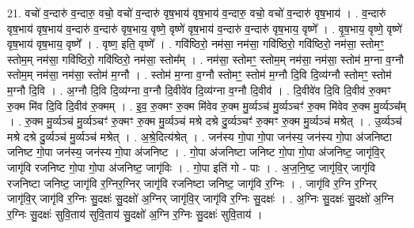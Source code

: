\documentclass[17pt]{extarticle}
\begin{document}
21. वचो॑ व॒न्दारु॑ व॒न्दारु॒ वचो॒ वचो॑ व॒न्दारु॑ वृष॒भाय॑ वृष॒भाय॑ व॒न्दारु॒ वचो॒ वचो॑ 
व॒न्दारु॑ वृष॒भाय॑ । . व॒न्दारु॑ वृष॒भाय॑ वृष॒भाय॑ व॒न्दारु॑ व॒न्दारु॑ वृष॒भाय॒ वृष्णे॒ वृष्णे॑ वृष॒भाय॑ व॒न्दारु॑ व॒न्दारु॑ वृष॒भाय॒ वृष्णे᳚ । . वृ॒ष॒भाय॒ वृष्णे॒ वृष्णे॑ वृष॒भाय॑ वृष॒भाय॒ वृष्णे᳚ । . वृष्ण॒ इति॒ वृष्णे᳚ । . गवि॑ष्ठिरो॒ नम॑सा॒ नम॑सा॒ गवि॑ष्ठिरो॒ गवि॑ष्ठिरो॒ नम॑सा॒ स्तोमꣳ॒॒ स्तोम॒म् नम॑सा॒ गवि॑ष्ठिरो॒ गवि॑ष्ठिरो॒ नम॑सा॒ स्तोम᳚म् । . नम॑सा॒ स्तोमꣳ॒॒ स्तोम॒म् नम॑सा॒ नम॑सा॒ स्तोम॑ म॒ग्ना व॒ग्नौ स्तोम॒म् नम॑सा॒ नम॑सा॒ स्तोम॑ म॒ग्नौ । . स्तोम॑ म॒ग्ना व॒ग्नौ स्तोमꣳ॒॒ स्तोम॑ म॒ग्नौ दि॒वि दि॒व्य॑ग्नौ स्तोमꣳ॒॒ स्तोम॑ म॒ग्नौ दि॒वि । . अ॒ग्नौ दि॒वि दि॒व्य॑ग्ना व॒ग्नौ दि॒वीवे॑व दि॒व्य॑ग्ना व॒ग्नौ दि॒वीव॑ । . दि॒वीवे॑व दि॒वि दि॒वीव॑ रु॒क्मꣳ रु॒क्म मि॑व दि॒वि दि॒वीव॑ रु॒क्मम् । . इ॒व॒ रु॒क्मꣳ रु॒क्म मि॑वेव रु॒क्म मु॒र्व्यञ्च॑ मु॒र्व्यञ्चꣳ॑ रु॒क्म मि॑वेव रु॒क्म मु॒र्व्यञ्च᳚म् । . रु॒क्म मु॒र्व्यञ्च॑ मु॒र्व्यञ्चꣳ॑ रु॒क्मꣳ रु॒क्म मु॒र्व्यञ्च॑ मश्रे दश्रे दु॒र्व्यञ्चꣳ॑ रु॒क्मꣳ रु॒क्म मु॒र्व्यञ्च॑ मश्रेत् । . उ॒र्व्यञ्च॑ मश्रे दश्रे दु॒र्व्यञ्च॑ मु॒र्व्यञ्च॑ मश्रेत् । . अ॒श्रे॒दित्य॑श्रेत् । . जन॑स्य गो॒पा गो॒पा जन॑स्य॒ जन॑स्य गो॒पा अ॑जनिष्टा जनिष्ट गो॒पा जन॑स्य॒ जन॑स्य गो॒पा अ॑जनिष्ट । . गो॒पा अ॑जनिष्टा जनिष्ट गो॒पा गो॒पा अ॑जनिष्ट॒ जागृ॑वि॒र् जागृ॑वि रजनिष्ट गो॒पा गो॒पा अ॑जनिष्ट॒ जागृ॑विः । . गो॒पा इति॑ गो - पाः । . अ॒ज॒नि॒ष्ट॒ जागृ॑वि॒र् जागृ॑वि रजनिष्टा जनिष्ट॒ जागृ॑वि र॒ग्निर॒ग्निर् जागृ॑वि रजनिष्टा जनिष्ट॒ जागृ॑वि र॒ग्निः । . जागृ॑वि र॒ग्नि र॒ग्निर् जागृ॑वि॒र् जागृ॑वि र॒ग्निः सु॒दक्षः॑ सु॒दक्षो॑ अ॒ग्निर् जागृ॑वि॒र् जागृ॑वि र॒ग्निः सु॒दक्षः॑ । . अ॒ग्निः सु॒दक्षः॑ सु॒दक्षो॑ अ॒ग्नि र॒ग्निः सु॒दक्षः॑ सुवि॒ताय॑ सुवि॒ताय॑ सु॒दक्षो॑ अ॒ग्नि र॒ग्निः सु॒दक्षः॑ सुवि॒ताय॑ । \newline
\end{document}

